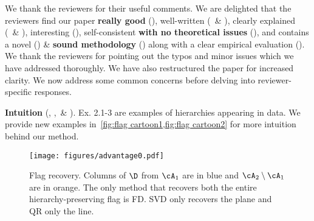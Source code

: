 \documentclass[10pt,twocolumn,letterpaper]{article}
\begin{document}
\maketitle
\thispagestyle{empty}
\appendix

\noindent We thank the reviewers for their useful comments. We are delighted that the reviewers find our paper \textbf{really good} (\Rtwo), well-written (\Rone~\& \Rthree), clearly explained (\Rone~\& \Rthree), interesting (\Rtwo), self-consistent \textbf{with no theoretical issues} (\Rone), and contains a novel (\Rfour) \& \textbf{sound methodology} (\Rtwo) along with a clear empirical evaluation (\Rthree). 
We thank the reviewers for pointing out the typos and minor issues which we have addressed thoroughly.
We have also restructured the paper for increased clarity. 
We now address some common concerns before delving into reviewer-specific responses.


\noindent \textbf{Intuition} (\Rone, \Rtwo,~\& \Rfour). Ex. 2.1-3 are examples of hierarchies appearing in data. We provide new examples in~\cref{fig:flag cartoon1,fig:flag cartoon2} for more intuition behind our method.
\begin{figure}[ht!]
    \centering
    \vspace{-3mm}
    \texttt{[image: figures/advantage0.pdf]}
    \vspace{-8mm}
    \caption{Flag recovery. Columns of $\D$ from $\cA_1$ are in blue and $\cA_2 \setminus \cA_1$ are in orange. The only method that recovers both the entire hierarchy-preserving flag is FD. SVD only recovers the plane and QR only the line.  }
    \vspace{-4mm}
    \label{fig:flag cartoon1}
\end{figure}
\end{document}
